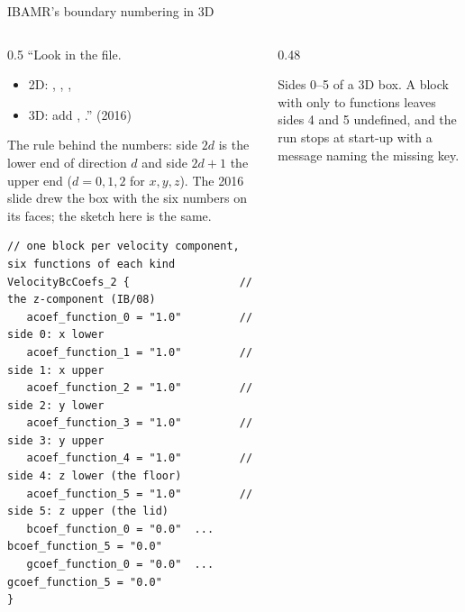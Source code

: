 \documentclass[aspectratio=169,11pt]{beamer}
\begin{document}
\begin{frame}[fragile]{IBAMR's boundary numbering in 3D}
\label{fr:sides}
\begin{columns}[T,onlytextwidth]
\begin{column}{0.5\textwidth}
\small ``Look in the  file.
\begin{itemize}
  \item 2D: , , , 
  \item 3D: add , .'' (2016)
\end{itemize}
\vspace{1mm}
\footnotesize The rule behind the numbers: side $2d$ is the lower end of direction $d$ and side $2d + 1$ the upper end ($d = 0, 1, 2$ for $x, y, z$). The 2016 slide drew the box with the six numbers on its faces; the sketch here is the same.
\begin{lstlisting}[style=inputtiny]
// one block per velocity component, six functions of each kind
VelocityBcCoefs_2 {                 // the z-component (IB/08)
   acoef_function_0 = "1.0"         // side 0: x lower
   acoef_function_1 = "1.0"         // side 1: x upper
   acoef_function_2 = "1.0"         // side 2: y lower
   acoef_function_3 = "1.0"         // side 3: y upper
   acoef_function_4 = "1.0"         // side 4: z lower (the floor)
   acoef_function_5 = "1.0"         // side 5: z upper (the lid)
   bcoef_function_0 = "0.0"  ...    bcoef_function_5 = "0.0"
   gcoef_function_0 = "0.0"  ...    gcoef_function_5 = "0.0"
}
\end{lstlisting}
\end{column}
\begin{column}{0.48\textwidth}
\centering
{}

\scriptsize Sides 0--5 of a 3D box. A block with only  to  functions leaves sides 4 and 5 undefined, and the run stops at start-up with a message naming the missing key.
\end{column}
\end{columns}
\end{frame}
\end{document}
